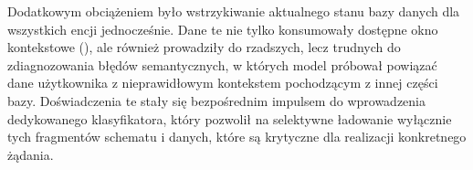 Dodatkowym obciążeniem było wstrzykiwanie aktualnego stanu bazy danych dla wszystkich encji jednocześnie. Dane te nie tylko konsumowały dostępne okno kontekstowe (), ale również prowadziły do rzadszych, lecz trudnych do zdiagnozowania błędów semantycznych, w których model próbował powiązać dane użytkownika z nieprawidłowym kontekstem pochodzącym z innej części bazy. Doświadczenia te stały się bezpośrednim impulsem do wprowadzenia dedykowanego klasyfikatora, który pozwolił na selektywne ładowanie wyłącznie tych fragmentów schematu i danych, które są krytyczne dla realizacji konkretnego żądania.